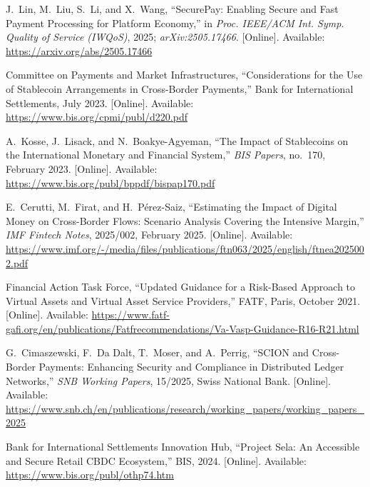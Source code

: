 \documentclass[12pt,a4paper]{report}
\begin{document}
{\begin{enumerate}[label={[\arabic*]}]
\item J.~Lin, M.~Liu, S.~Li, and X.~Wang, ``SecurePay: Enabling Secure and Fast Payment Processing for Platform Economy,'' in \textit{Proc. IEEE/ACM Int. Symp. Quality of Service (IWQoS)}, 2025; \textit{arXiv:2505.17466}. [Online]. Available: \url{https://arxiv.org/abs/2505.17466}

\item Committee on Payments and Market Infrastructures, ``Considerations for the Use of Stablecoin Arrangements in Cross-Border Payments,'' Bank for International Settlements, July 2023. [Online]. Available: \url{https://www.bis.org/cpmi/publ/d220.pdf}

\item A.~Kosse, J.~Lisack, and N.~Boakye-Agyeman, ``The Impact of Stablecoins on the International Monetary and Financial System,'' \textit{BIS Papers}, no.~170, February 2023. [Online]. Available: \url{https://www.bis.org/publ/bppdf/bispap170.pdf}

\item E.~Cerutti, M.~Firat, and H.~P\'{e}rez-Saiz, ``Estimating the Impact of Digital Money on Cross-Border Flows: Scenario Analysis Covering the Intensive Margin,'' \textit{IMF Fintech Notes}, 2025/002, February 2025. [Online]. Available: \url{https://www.imf.org/-/media/files/publications/ftn063/2025/english/ftnea2025002.pdf}

\item Financial Action Task Force, ``Updated Guidance for a Risk-Based Approach to Virtual Assets and Virtual Asset Service Providers,'' FATF, Paris, October 2021. [Online]. Available: \url{https://www.fatf-gafi.org/en/publications/Fatfrecommendations/Va-Vasp-Guidance-R16-R21.html}

\item G.~Cimaszewski, F.~Da Dalt, T.~Moser, and A.~Perrig, ``SCION and Cross-Border Payments: Enhancing Security and Compliance in Distributed Ledger Networks,'' \textit{SNB Working Papers}, 15/2025, Swiss National Bank. [Online]. Available: \url{https://www.snb.ch/en/publications/research/working_papers/working_papers_2025}

\item Bank for International Settlements Innovation Hub, ``Project Sela: An Accessible and Secure Retail CBDC Ecosystem,'' BIS, 2024. [Online]. Available: \url{https://www.bis.org/publ/othp74.htm}

\end{enumerate}
}
\end{document}
